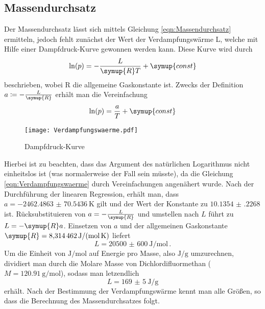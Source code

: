 \subsection{Massendurchsatz}
Der Massendurchsatz lässt sich mittels Gleichung \eqref{eqn:Massendurchsatz} ermitteln, jedoch fehlt zunächst der Wert der Verdampfungswärme L, welche 
mit Hilfe einer Dampfdruck-Kurve gewonnen werden kann. Diese Kurve wird durch 
\begin{equation}
  \ln (p) = -\frac{L}{\symup{R}T} + \symup{const} \label{eqn:Verdampfungswaerme}
\end{equation}
beschrieben, wobei R die allgemeine Gaskonstante ist. Zwecks der Definition $a \coloneq -\frac{L}{\symup{R}}$ erhält man die Vereinfachung
\begin{equation}
  \ln (p) = \frac{a}{T} + \symup{const}
\end{equation}
\begin{figure}
  \centering
  \texttt{[image: Verdampfungswaerme.pdf]}
  \caption{Dampfdruck-Kurve}
  \label{fig:Dampfdruck}
\end{figure}
Hierbei ist zu beachten, dass das Argument des natürlichen Logarithmus nicht einheitslos ist (was normalerweise
der Fall sein müsste), da die Gleichung \eqref{eqn:Verdampfungswaerme} durch Vereinfachungen angenähert wurde.
Nach der Durchführung der linearen Regression, erhält man, dass $a = \SI{-2462.4863(705436)}{\kelvin}$ gilt und der Wert der Konstante zu $\num{10.1354(2268)}$ ist.
Rücksubstituieren von $a = -\frac{L}{\symup{R}}$ und umstellen nach $L$ führt zu $ L = - \symup{R}a$. Einsetzen von $a$ und der allgemeinen Gaskonstante 
$\symup{R} = \SI{8.314462}{\joule\per\mole\per\kelvin}$ liefert
\begin{equation}
  L = \SI{20500(600)}{\joule\per\mol}\, .
\end{equation}
Um die Einheit von $\si{\joule\per\mole}$ auf Energie pro Masse, also $\si{\joule\per\gram}$ umzurechnen, dividiert man durch die Molare
Masse von Dichlordifluormethan ($M = \SI{120.91}{\gram\per\mole}$), sodass man letzendlich
\begin{equation}
  L = \SI{169(5)}{\joule\per\gram}
\end{equation}
erhält.
Nach der Bestimmung der Verdampfungswärme kennt man alle Größen, so dass die Berechnung des Massendurchsatzes folgt.
